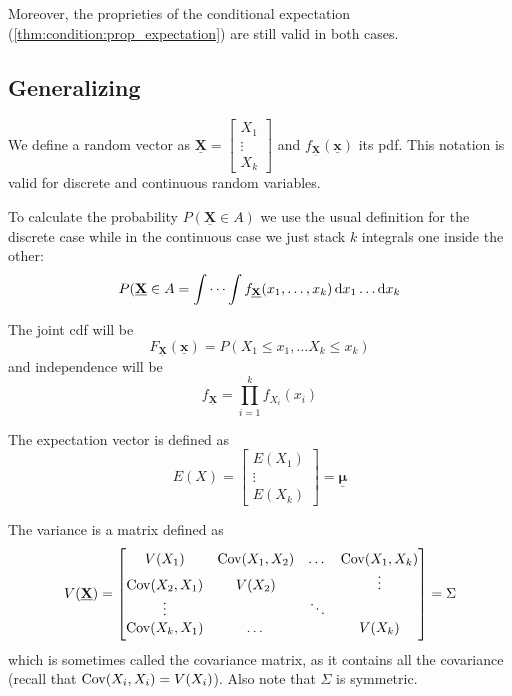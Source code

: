 \documentclass[12pt]{extarticle}
\newcommand{\cov}{{\operatorfont Cov}}
\renewcommand{\vec}[1]{\underline{\mathbf{#1}}}
\begin{document}
Moreover, the proprieties of the conditional expectation (\autoref{thm:condition:prop_expectation}) are still valid in both cases.

\subsection{Generalizing}

We define a random vector as $\vec X =
    \begin{bmatrix}
        X_1    \\
        \vdots \\
        X_k
    \end{bmatrix}$
and $f_{\vec X}(\vec x)$ its pdf.
This notation is valid for discrete and continuous random variables.

To calculate the probability $P(\vec X \in A)$ we use the usual definition for the discrete case while in the continuous case we just stack $k$ integrals one inside the other:
\begin{equation}
    P(\vec X \in A = \idotsint f_{\vec X}(x_1, \ldots, x_k) \dd{x_1} \ldots \dd{x_k}
\end{equation}

The joint cdf will be
\begin{equation}
    F_{\vec X}(\vec x) = P(X_1 \leq x_1, \ldots X_k \leq x_k)
\end{equation}
and independence will be
\begin{equation}
    f_{\vec X} = \prod_{i = 1}^{k} f_{X_i}(x_i)
\end{equation}

The expectation vector is defined as
\begin{equation}
    E(X) = \begin{bmatrix}
        E(X_1) \\
        \vdots \\
        E(X_k)
    \end{bmatrix} = \vec \mu
\end{equation}

The variance is a matrix defined as
\begin{equation}
    V(\vec X) = \begin{bmatrix}
        V(X_1)         & \cov(X_1, X_2) & \dots  & \cov(X_1, X_k) \\
        \cov(X_2, X_1) & V(X_2)         &        & \vdots         \\
        \vdots         &                & \ddots &                \\
        \cov(X_k, X_1) & \dots          &        & V(X_k)
    \end{bmatrix} = \Sigma
\end{equation}
which is sometimes called the covariance matrix, as it contains all the covariance (recall that $\cov(X_i, X_i)= V(X_i)$).
Also note that $\Sigma$ is symmetric.
\end{document}
